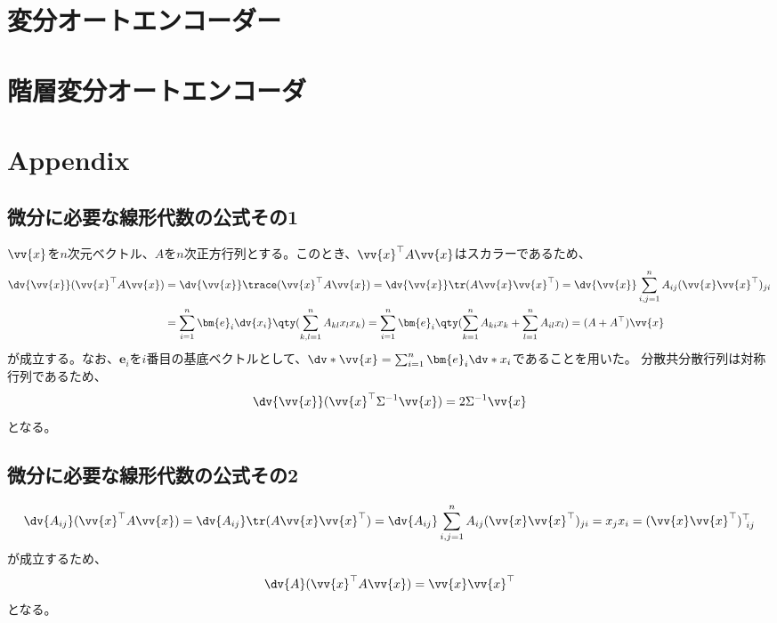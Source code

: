 \documentclass[a4paper,11pt,uplatex]{jsarticle}%
\begin{document}
\section{変分オートエンコーダー}

\section{階層変分オートエンコーダ}


\newpage
\section{Appendix}

\subsection{微分に必要な線形代数の公式その1}
$\vv{x}$を$n$次元ベクトル、$A$を$n$次正方行列とする。このとき、$\vv{x}^{\top}A\vv{x}$はスカラーであるため、
\begin{align}
  \dv{\vv{x}}(\vv{x}^{\top}A\vv{x}) & = \dv{\vv{x}}\trace(\vv{x}^{\top}A\vv{x}) = \dv{\vv{x}}\tr(A\vv{x}\vv{x}^{\top})
  = \dv{\vv{x}}\sum_{i,j=1}^{n}A_{ij}(\vv{x}\vv{x}^{\top})_{ji} \notag                                                 \\
                                    & = \sum_{i=1}^{n}\bm{e}_{i}\dv{x_i}\qty(\sum_{k,l=1}^{n}A_{kl}x_lx_k)
  = \sum_{i=1}^{n}\bm{e}_{i}\qty(\sum_{k=1}^{n}A_{ki}x_k + \sum_{l=1}^{n}A_{il}x_l) = (A+A^{\top})\vv{x}
\end{align}
が成立する。なお、$\bm{e}_i$を$i$番目の基底ベクトルとして、$\dv*{\vv{x}} = \sum_{i=1}^{n}\bm{e}_i\dv*{x_i}$であることを用いた。
分散共分散行列は対称行列であるため、
\begin{equation}
  \dv{\vv{x}}(\vv{x}^{\top}\Sigma^{-1}\vv{x}) = 2\Sigma^{-1}\vv{x}
\end{equation}
となる。
\subsection{微分に必要な線形代数の公式その2}
\begin{equation}
  \dv{A_{ij}}(\vv{x}^{\top}A\vv{x})  = \dv{A_{ij}}\tr(A\vv{x}\vv{x}^{\top})
  = \dv{A_{ij}}\sum_{i,j=1}^{n}A_{ij}(\vv{x}\vv{x}^{\top})_{ji} = x_jx_i = (\vv{x}\vv{x}^{\top})^{\top}_{~ij}
\end{equation}
が成立するため、
\begin{equation}
  \dv{A}(\vv{x}^{\top}A\vv{x})  = \vv{x}\vv{x}^{\top}
\end{equation}
となる。
\end{document}
